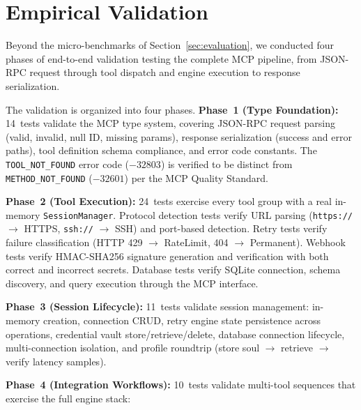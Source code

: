 \documentclass[10pt, twocolumn]{article}
\begin{document}
\section{Empirical Validation}
\label{sec:validation}

Beyond the micro-benchmarks of Section~\ref{sec:evaluation}, we conducted four phases of end-to-end validation testing the complete MCP pipeline, from JSON-RPC request through tool dispatch and engine execution to response serialization.

The validation is organized into four phases. \textbf{Phase~1 (Type Foundation):} 14~tests validate the MCP type system, covering JSON-RPC request parsing (valid, invalid, null ID, missing params), response serialization (success and error paths), tool definition schema compliance, and error code constants. The \texttt{TOOL\_NOT\_FOUND} error code ($-32803$) is verified to be distinct from \texttt{METHOD\_NOT\_FOUND} ($-32601$) per the MCP Quality Standard.

\textbf{Phase~2 (Tool Execution):} 24~tests exercise every tool group with a real in-memory \texttt{SessionManager}. Protocol detection tests verify URL parsing (\texttt{https://} $\to$ HTTPS, \texttt{ssh://} $\to$ SSH) and port-based detection. Retry tests verify failure classification (HTTP 429 $\to$ RateLimit, 404 $\to$ Permanent). Webhook tests verify HMAC-SHA256 signature generation and verification with both correct and incorrect secrets. Database tests verify SQLite connection, schema discovery, and query execution through the MCP interface.

\textbf{Phase~3 (Session Lifecycle):} 11~tests validate session management: in-memory creation, connection CRUD, retry engine state persistence across operations, credential vault store/retrieve/delete, database connection lifecycle, multi-connection isolation, and profile roundtrip (store soul $\to$ retrieve $\to$ verify latency samples).

\textbf{Phase~4 (Integration Workflows):} 10~tests validate multi-tool sequences that exercise the full engine stack:
\end{document}
